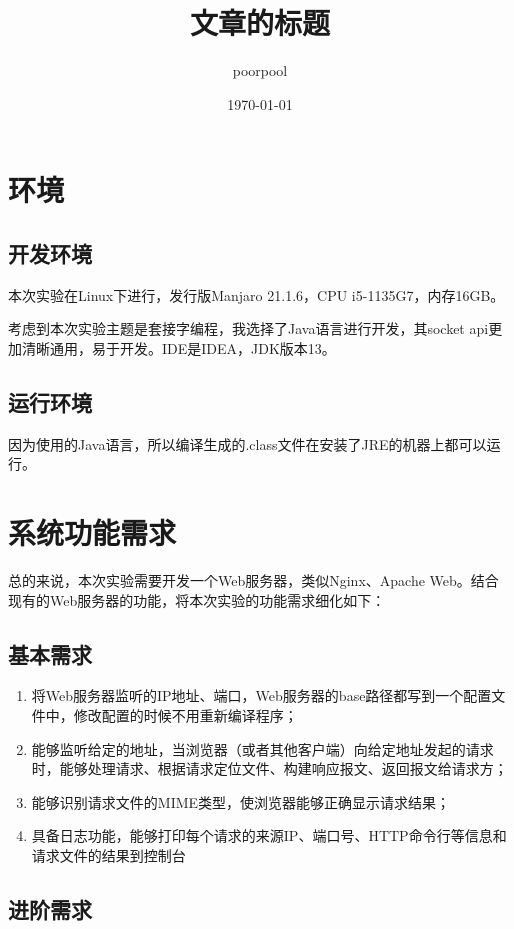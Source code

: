 \documentclass[UTF8,12pt]{ctexart}
\title{\bfseries 文章的标题}
\author{poorpool}
\date{\today}
\begin{document}
	
\section{环境}

\subsection{开发环境}

本次实验在Linux下进行，发行版Manjaro 21.1.6，CPU i5-1135G7，内存16GB。

考虑到本次实验主题是套接字编程，我选择了Java语言进行开发，其socket api更加清晰通用，易于开发。IDE是IDEA，JDK版本13。

\subsection{运行环境}

因为使用的Java语言，所以编译生成的.class文件在安装了JRE的机器上都可以运行。

\section{系统功能需求}

总的来说，本次实验需要开发一个Web服务器，类似Nginx、Apache Web。结合现有的Web服务器的功能，将本次实验的功能需求细化如下：

\subsection{基本需求}

\begin{enumerate}
	\item 将Web服务器监听的IP地址、端口，Web服务器的base路径都写到一个配置文件中，修改配置的时候不用重新编译程序；
	\item 能够监听给定的地址，当浏览器（或者其他客户端）向给定地址发起的请求时，能够处理请求、根据请求定位文件、构建响应报文、返回报文给请求方；
	\item 能够识别请求文件的MIME类型，使浏览器能够正确显示请求结果；
	\item 具备日志功能，能够打印每个请求的来源IP、端口号、HTTP命令行等信息和请求文件的结果到控制台
\end{enumerate}

\subsection{进阶需求}
\end{document}
